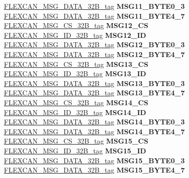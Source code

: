 \begin{DoxyCompactItemize}
\begin{tabbing}
\>\>\mbox{\hyperlink{unionFLEXCAN__MSG__DATA__32B__tag}{FLEXCAN\_MSG\_DATA\_32B\_tag}} {\bfseries MSG11\_BYTE0\_3}\\
\>\>\mbox{\hyperlink{unionFLEXCAN__MSG__DATA__32B__tag}{FLEXCAN\_MSG\_DATA\_32B\_tag}} {\bfseries MSG11\_BYTE4\_7}\\
\>\>\mbox{\hyperlink{unionFLEXCAN__MSG__CS__32B__tag}{FLEXCAN\_MSG\_CS\_32B\_tag}} {\bfseries MSG12\_CS}\\
\>\>\mbox{\hyperlink{unionFLEXCAN__MSG__ID__32B__tag}{FLEXCAN\_MSG\_ID\_32B\_tag}} {\bfseries MSG12\_ID}\\
\>\>\mbox{\hyperlink{unionFLEXCAN__MSG__DATA__32B__tag}{FLEXCAN\_MSG\_DATA\_32B\_tag}} {\bfseries MSG12\_BYTE0\_3}\\
\>\>\mbox{\hyperlink{unionFLEXCAN__MSG__DATA__32B__tag}{FLEXCAN\_MSG\_DATA\_32B\_tag}} {\bfseries MSG12\_BYTE4\_7}\\
\>\>\mbox{\hyperlink{unionFLEXCAN__MSG__CS__32B__tag}{FLEXCAN\_MSG\_CS\_32B\_tag}} {\bfseries MSG13\_CS}\\
\>\>\mbox{\hyperlink{unionFLEXCAN__MSG__ID__32B__tag}{FLEXCAN\_MSG\_ID\_32B\_tag}} {\bfseries MSG13\_ID}\\
\>\>\mbox{\hyperlink{unionFLEXCAN__MSG__DATA__32B__tag}{FLEXCAN\_MSG\_DATA\_32B\_tag}} {\bfseries MSG13\_BYTE0\_3}\\
\>\>\mbox{\hyperlink{unionFLEXCAN__MSG__DATA__32B__tag}{FLEXCAN\_MSG\_DATA\_32B\_tag}} {\bfseries MSG13\_BYTE4\_7}\\
\>\>\mbox{\hyperlink{unionFLEXCAN__MSG__CS__32B__tag}{FLEXCAN\_MSG\_CS\_32B\_tag}} {\bfseries MSG14\_CS}\\
\>\>\mbox{\hyperlink{unionFLEXCAN__MSG__ID__32B__tag}{FLEXCAN\_MSG\_ID\_32B\_tag}} {\bfseries MSG14\_ID}\\
\>\>\mbox{\hyperlink{unionFLEXCAN__MSG__DATA__32B__tag}{FLEXCAN\_MSG\_DATA\_32B\_tag}} {\bfseries MSG14\_BYTE0\_3}\\
\>\>\mbox{\hyperlink{unionFLEXCAN__MSG__DATA__32B__tag}{FLEXCAN\_MSG\_DATA\_32B\_tag}} {\bfseries MSG14\_BYTE4\_7}\\
\>\>\mbox{\hyperlink{unionFLEXCAN__MSG__CS__32B__tag}{FLEXCAN\_MSG\_CS\_32B\_tag}} {\bfseries MSG15\_CS}\\
\>\>\mbox{\hyperlink{unionFLEXCAN__MSG__ID__32B__tag}{FLEXCAN\_MSG\_ID\_32B\_tag}} {\bfseries MSG15\_ID}\\
\>\>\mbox{\hyperlink{unionFLEXCAN__MSG__DATA__32B__tag}{FLEXCAN\_MSG\_DATA\_32B\_tag}} {\bfseries MSG15\_BYTE0\_3}\\
\>\>\mbox{\hyperlink{unionFLEXCAN__MSG__DATA__32B__tag}{FLEXCAN\_MSG\_DATA\_32B\_tag}} {\bfseries MSG15\_BYTE4\_7}\\

\end{tabbing}
\end{DoxyCompactItemize}
